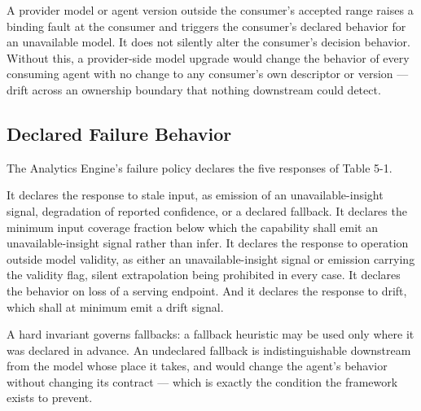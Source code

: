 A provider model or agent version outside the consumer's accepted range
raises a binding fault at the consumer and triggers the consumer's
declared behavior for an unavailable model. It does not silently alter
the consumer's decision behavior. Without this, a provider-side model
upgrade would change the behavior of every consuming agent with no
change to any consumer's own descriptor or version --- drift across an
ownership boundary that nothing downstream could detect.

\hypertarget{declared-failure-behavior-1}{%
\subsection{Declared Failure Behavior}\label{declared-failure-behavior-1}}

The Analytics Engine's failure policy declares the five responses of
Table 5-1.

It declares the response to stale input, as emission of an
unavailable-insight signal, degradation of reported confidence, or a
declared fallback. It declares the minimum input coverage fraction below
which the capability shall emit an unavailable-insight signal rather
than infer. It declares the response to operation outside model
validity, as either an unavailable-insight signal or emission carrying
the validity flag, silent extrapolation being prohibited in every case.
It declares the behavior on loss of a serving endpoint. And it declares
the response to drift, which shall at minimum emit a drift signal.

A hard invariant governs fallbacks: a fallback heuristic may be used
only where it was declared in advance. An undeclared fallback is
indistinguishable downstream from the model whose place it takes, and
would change the agent's behavior without changing its contract ---
which is exactly the condition the framework exists to prevent.

